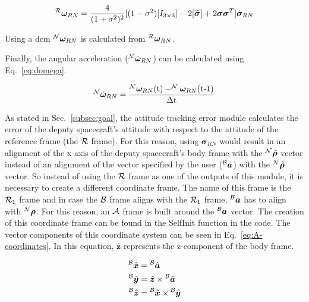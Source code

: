 \documentclass[]{AVSreport}
\begin{document}
\begin{equation}
    ^{\cal R}{\bm \omega}_{RN} = \frac{4}{(1 + \sigma^{2})^{2}}[(1-\sigma^{2})[I_{3 \times 3}] - 2[\widetilde{\bm \sigma}] + 2{\bm \sigma}{\bm \sigma}^{T}]\dot{\bm \sigma}_{RN}
    \label{eq:omega_eq}
\end{equation}

Using a dcm $^{\cal N}{\bm \omega}_{RN}$ is calculated from $^{\cal R}{\bm \omega}_{RN}$.

Finally, the angular acceleration ($^{\cal N}\dot{\bm \omega}_{RN}$) can be calculated using Eq.~\eqref{eq:domega}.

\begin{equation}
    ^{\cal N}\dot{\bm \omega}_{RN} = \frac{^{\cal N}{\bm \omega}_{RN}(\textrm{t}) - ^{\cal N}{\bm \omega}_{RN}(\textrm{t-1})}{\Delta \textrm{t}}
    \label{eq:domega}
\end{equation}

As stated in Sec.~\ref{subsec:goal}, the attitude tracking error module calculates the error of the deputy spacecraft's attitude with respect to the attitude of the reference frame (the ${\cal R}$ frame). For this reason, using ${\bm \sigma}_{RN}$ would result in an alignment of the x-axis of the deputy spacecraft's body frame with the $^{\cal N}\hat{{\bm \rho}}$ vector instead of an alignment of the vector specified by the user ($^{\cal B}{\bm a}$) with the $^{\cal N}\hat{{\bm \rho}}$ vector. So instead of using the ${\cal R}$ frame as one of the outputs of this module, it is necessary to create a different coordinate frame. The name of this frame is the ${\cal R}_{1}$ frame and in case the ${\cal B}$ frame aligns with the ${\cal R}_{1}$ frame, $^{\cal B}{\bm a}$ has to align with $^{\cal N}{\bm \rho}$. For this reason, an ${\cal A}$ frame is built around the $^{\cal B}{\bm a}$ vector. The creation of this coordinate frame can be found in the SelfInit function in the code. The vector components of this coordinate system can be seen in Eq.~\eqref{eq:A-coordinates}. In this equation, ${\hat{\bm z}}$ represents the z-component of the body frame.

\begin{equation}
    \begin{split}
    {^{\cal B}\hat{{\bm x}}} &= {^{\cal B}\hat{{\bm a}}} \\
    {^{\cal B}\hat{{\bm y}}} &= {\hat{\bm z}} \times {^{\cal B}\hat{{\bm a}}} \\
    {^{\cal B}\hat{{\bm z}}} &= {^{\cal B}\hat{{\bm x}}} \times {^{\cal B}\hat{{\bm y}}}
    \end{split}
    \label{eq:A-coordinates}
\end{equation}
\end{document}
